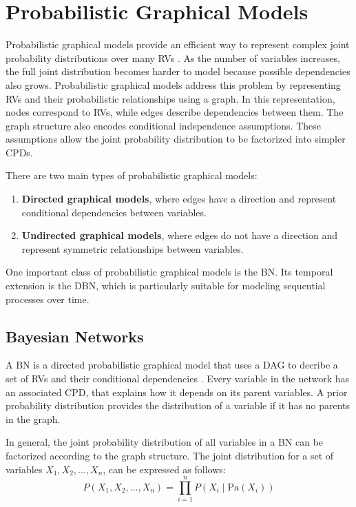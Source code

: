 \section{Probabilistic Graphical Models}
\label{sec:pgm}

Probabilistic graphical models provide an efficient way to represent complex joint probability distributions over many \acp{RV} \cite{pml1Book,koller2009probabilistic}. 
As the number of variables increases, the full joint distribution becomes harder to model because possible dependencies also grows.  
Probabilistic graphical models address this problem by representing \acp{RV} and their probabilistic relationships using a graph. 
In this representation, nodes correspond to \acp{RV}, while edges describe dependencies between them. 
The graph structure also encodes conditional independence assumptions. These assumptions allow the joint probability distribution to 
be factorized into simpler \acp{CPD}.

\par There are two main types of probabilistic graphical models:
\begin{enumerate}
    \item \textbf{Directed graphical models}, where edges have a direction and represent conditional dependencies between variables.
    \item \textbf{Undirected graphical models}, where edges do not have a direction and represent symmetric relationships between variables.
\end{enumerate}

\par One important class of probabilistic graphical models is the \ac{BN}. Its temporal extension is the \ac{DBN}, which is particularly suitable for modeling 
sequential processes over time.


\subsection{Bayesian Networks}
\label{sec:bayesian_networks}

A \ac{BN} is a directed probabilistic graphical model that uses a \ac{DAG} to decribe a set of \acp{RV} and their conditional dependencies \cite{koller2009probabilistic}. 
Every variable in the network has an associated \ac{CPD}, that explains how it depends on its parent variables.  
A prior probability distribution provides the distribution of a variable if it has no parents in the graph.  

\par In general, the joint probability distribution of all variables in a \ac{BN} can be factorized according to the graph structure. The joint distribution for a set of variables 
$X_1, X_2, \dots, X_n$, can be expressed as follows:
\begin{equation}
P(X_1, X_2, \dots, X_n) = \prod_{i=1}^{n} P(X_i \mid \mathrm{Pa}(X_i))
\label{eq:bn_factorization}
\end{equation}

